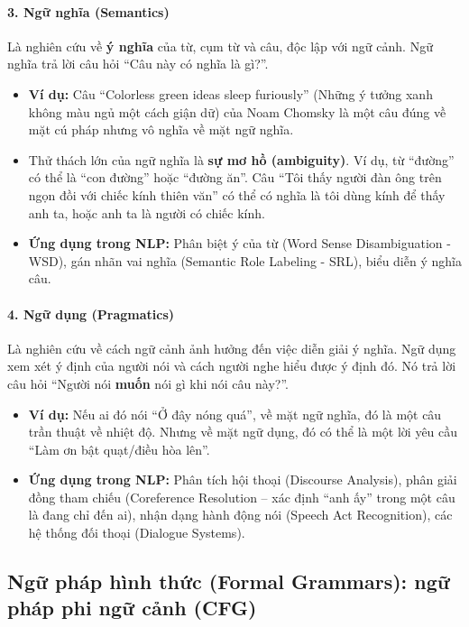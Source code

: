 \paragraph{3. Ngữ nghĩa (Semantics)}
Là nghiên cứu về \textbf{ý nghĩa} của từ, cụm từ và câu, độc lập với ngữ cảnh. Ngữ nghĩa trả lời câu hỏi “Câu này có nghĩa là gì?”.
\begin{itemize}
    \item \textbf{Ví dụ:} Câu “Colorless green ideas sleep furiously” (Những ý tưởng xanh không màu ngủ một cách giận dữ) của Noam Chomsky là một câu đúng về mặt cú pháp nhưng vô nghĩa về mặt ngữ nghĩa.
    \item Thử thách lớn của ngữ nghĩa là \textbf{sự mơ hồ (ambiguity)}. Ví dụ, từ “đường” có thể là “con đường” hoặc “đường ăn”. Câu “Tôi thấy người đàn ông trên ngọn đồi với chiếc kính thiên văn” có thể có nghĩa là tôi dùng kính để thấy anh ta, hoặc anh ta là người có chiếc kính.
    \item \textbf{Ứng dụng trong NLP:} Phân biệt ý của từ (Word Sense Disambiguation - WSD), gán nhãn vai nghĩa (Semantic Role Labeling - SRL), biểu diễn ý nghĩa câu.
\end{itemize}

\paragraph{4. Ngữ dụng (Pragmatics)}
Là nghiên cứu về cách ngữ cảnh ảnh hưởng đến việc diễn giải ý nghĩa. Ngữ dụng xem xét ý định của người nói và cách người nghe hiểu được ý định đó. Nó trả lời câu hỏi “Người nói \textbf{muốn} nói gì khi nói câu này?”.
\begin{itemize}
    \item \textbf{Ví dụ:} Nếu ai đó nói “Ở đây nóng quá”, về mặt ngữ nghĩa, đó là một câu trần thuật về nhiệt độ. Nhưng về mặt ngữ dụng, đó có thể là một lời yêu cầu “Làm ơn bật quạt/điều hòa lên”.
    \item \textbf{Ứng dụng trong NLP:} Phân tích hội thoại (Discourse Analysis), phân giải đồng tham chiếu (Coreference Resolution -- xác định “anh ấy” trong một câu là đang chỉ đến ai), nhận dạng hành động nói (Speech Act Recognition), các hệ thống đối thoại (Dialogue Systems).
\end{itemize}

\subsection{Ngữ pháp hình thức (Formal Grammars): ngữ pháp phi ngữ cảnh (CFG)}
\label{ssec:cfg}


